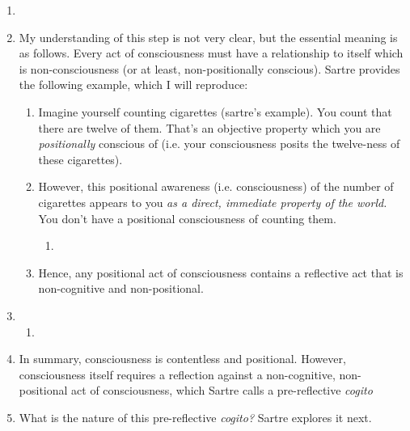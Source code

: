 \begin{enumerate}
  \item {}
  \item My understanding of this step is not very clear, but the essential meaning is as follows. Every act of consciousness must have a relationship to itself which is non-consciousness (or at least, non-positionally conscious). Sartre provides the following example, which I will reproduce:
  \begin{enumerate}
    \item Imagine yourself counting cigarettes (sartre's example). You count that there are twelve of them. That's an objective property which you are \emph{positionally} conscious of (i.e. your consciousness posits the twelve-ness of these cigarettes).
    \item However, this positional awareness (i.e. consciousness) of the number of cigarettes appears to you \emph{as a direct, immediate property of the world.} You don't have a positional consciousness of counting them.
    \begin{enumerate}
      \item {}
    \end{enumerate}
    \item Hence, any positional act of consciousness contains a reflective act that is non-cognitive and non-positional. 
  \end{enumerate}
  \item {}
  \begin{enumerate}
    \item {}
  \end{enumerate}
  \item In summary, consciousness is contentless and positional. However, consciousness itself requires a reflection against a non-cognitive, non-positional act of consciousness, which Sartre calls a pre-reflective \emph{cogito}
  \item What is the nature of this pre-reflective \emph{cogito?} Sartre explores it next.
\end{enumerate}

